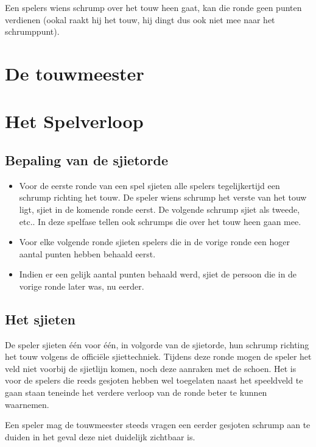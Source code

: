 \documentclass[a4paper,12pt,titlepage]{article}
\begin{document}
Een spelers wiens schrump over het touw heen gaat, kan die ronde geen punten verdienen (ookal raakt hij het touw, hij dingt dus ook niet mee naar het schrumppunt).

\newpage

\section{De touwmeester}

\newpage



\section{Het Spelverloop}

\subsection{Bepaling van de sjietorde}

\begin{itemize}
\item Voor de eerste ronde van een spel sjieten alle spelers tegelijkertijd een schrump richting het touw. De speler wiens schrump het verste van het touw ligt, sjiet in de komende ronde eerst. De volgende
      schrump sjiet als tweede, etc.. In deze spelfase tellen ook schrumps die over het touw heen gaan mee.
 \item Voor elke volgende ronde sjieten spelers die in de vorige ronde een hoger aantal punten hebben behaald eerst. 
 \item Indien er een gelijk aantal punten behaald werd, sjiet de persoon die in de vorige ronde later was, nu eerder.
\end{itemize}

\subsection{Het sjieten}

De speler sjieten \'e\'en voor \'e\'en, in volgorde van de sjietorde, hun schrump richting het touw volgens de offici\"ele sjiettechniek. Tijdens deze ronde mogen de speler het veld niet voorbij de sjietlijn komen, noch deze
aanraken met de schoen. Het is voor de spelers die reeds gesjoten hebben wel toegelaten naast het speeldveld te gaan staan teneinde het verdere verloop van de ronde beter te kunnen waarnemen. 

Een speler mag de touwmeester steeds vragen een eerder gesjoten schrump aan te duiden in het geval deze niet duidelijk zichtbaar is.
\end{document}
